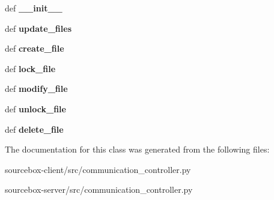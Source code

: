 \begin{DoxyCompactItemize}
\item 
\hypertarget{classsrc_1_1communication__controller_1_1_communication___controller_a94862bb57729b432b60a8410290a3bf8}{def {\bfseries \-\_\-\-\_\-init\-\_\-\-\_\-}}\label{classsrc_1_1communication__controller_1_1_communication___controller_a94862bb57729b432b60a8410290a3bf8}

\item 
\hypertarget{classsrc_1_1communication__controller_1_1_communication___controller_aec0c66fcdd1004d21a80534d290e0a8e}{def {\bfseries update\-\_\-files}}\label{classsrc_1_1communication__controller_1_1_communication___controller_aec0c66fcdd1004d21a80534d290e0a8e}

\item 
\hypertarget{classsrc_1_1communication__controller_1_1_communication___controller_a4b5613ea0c4987288e539ed90c9af582}{def {\bfseries create\-\_\-file}}\label{classsrc_1_1communication__controller_1_1_communication___controller_a4b5613ea0c4987288e539ed90c9af582}

\item 
\hypertarget{classsrc_1_1communication__controller_1_1_communication___controller_a47092ca1a4a65b6363b6762087346074}{def {\bfseries lock\-\_\-file}}\label{classsrc_1_1communication__controller_1_1_communication___controller_a47092ca1a4a65b6363b6762087346074}

\item 
\hypertarget{classsrc_1_1communication__controller_1_1_communication___controller_a544c46299932b770685575cf7195db00}{def {\bfseries modify\-\_\-file}}\label{classsrc_1_1communication__controller_1_1_communication___controller_a544c46299932b770685575cf7195db00}

\item 
\hypertarget{classsrc_1_1communication__controller_1_1_communication___controller_ae41fb68815ce4c9fce84ec4d22baf1e9}{def {\bfseries unlock\-\_\-file}}\label{classsrc_1_1communication__controller_1_1_communication___controller_ae41fb68815ce4c9fce84ec4d22baf1e9}

\item 
\hypertarget{classsrc_1_1communication__controller_1_1_communication___controller_a72e1c71e0cb75efefa844e3a8eafc21c}{def {\bfseries delete\-\_\-file}}\label{classsrc_1_1communication__controller_1_1_communication___controller_a72e1c71e0cb75efefa844e3a8eafc21c}

\end{DoxyCompactItemize}


The documentation for this class was generated from the following files\-:\begin{DoxyCompactItemize}
\item 
sourcebox-\/client/src/communication\-\_\-controller.\-py\item 
sourcebox-\/server/src/communication\-\_\-controller.\-py\end{DoxyCompactItemize}
